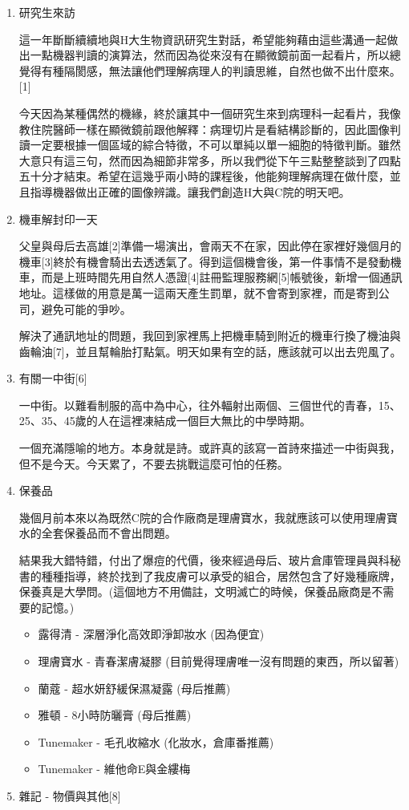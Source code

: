 \documentclass[a5paper, 12pt
]{book}
\providecommand{\tightlist}{%
  \setlength{\itemsep}{0pt}\setlength{\parskip}{0pt}}
\begin{document}
\begin{enumerate}
\def\labelenumi{\arabic{enumi}.}
\item
  研究生來訪

  這一年斷斷續續地與H大生物資訊研究生對話，希望能夠藉由這些溝通一起做出一點機器判讀的演算法，然而因為從來沒有在顯微鏡前面一起看片，所以總覺得有種隔閡感，無法讓他們理解病理人的判讀思維，自然也做不出什麼來。{[}1{]}

  今天因為某種偶然的機緣，終於讓其中一個研究生來到病理科一起看片，我像教住院醫師一樣在顯微鏡前跟他解釋：病理切片是看結構診斷的，因此圖像判讀一定要根據一個區域的綜合特徵，不可以單純以單一細胞的特徵判斷。雖然大意只有這三句，然而因為細節非常多，所以我們從下午三點整整談到了四點五十分才結束。希望在這幾乎兩小時的課程後，他能夠理解病理在做什麼，並且指導機器做出正確的圖像辨識。讓我們創造H大與C院的明天吧。
\item
  機車解封印一天

  父皇與母后去高雄{[}2{]}準備一場演出，會兩天不在家，因此停在家裡好幾個月的機車{[}3{]}終於有機會騎出去透透氣了。得到這個機會後，第一件事情不是發動機車，而是上班時間先用自然人憑證{[}4{]}註冊監理服務網{[}5{]}帳號後，新增一個通訊地址。這樣做的用意是萬一這兩天產生罰單，就不會寄到家裡，而是寄到公司，避免可能的爭吵。

  解決了通訊地址的問題，我回到家裡馬上把機車騎到附近的機車行換了機油與齒輪油{[}7{]}，並且幫輪胎打點氣。明天如果有空的話，應該就可以出去兜風了。
\item
  有關一中街{[}6{]}

  一中街。以難看制服的高中為中心，往外輻射出兩個、三個世代的青春，15、25、35、45歲的人在這裡凍結成一個巨大無比的中學時期。

  一個充滿隱喻的地方。本身就是詩。或許真的該寫一首詩來描述一中街與我，但不是今天。今天累了，不要去挑戰這麼可怕的任務。
\item
  保養品

  幾個月前本來以為既然C院的合作廠商是理膚寶水，我就應該可以使用理膚寶水的全套保養品而不會出問題。

  結果我大錯特錯，付出了爆痘的代價，後來經過母后、玻片倉庫管理員與科秘書的種種指導，終於找到了我皮膚可以承受的組合，居然包含了好幾種廠牌，保養真是大學問。(這個地方不用備註，文明滅亡的時候，保養品廠商是不需要的記憶。)

  \begin{itemize}
  \tightlist
  \item
    露得清 - 深層淨化高效即淨卸妝水 (因為便宜)
  \item
    理膚寶水 - 青春潔膚凝膠 (目前覺得理膚唯一沒有問題的東西，所以留著)
  \item
    蘭蔻 - 超水妍舒緩保濕凝露 (母后推薦)
  \item
    雅頓 - 8小時防曬膏 (母后推薦)
  \item
    Tunemaker - 毛孔收縮水 (化妝水，倉庫番推薦)
  \item
    Tunemaker - 維他命E與金縷梅
  \end{itemize}
\item
  雜記 - 物價與其他{[}8{]}


\end{enumerate}
\end{document}
